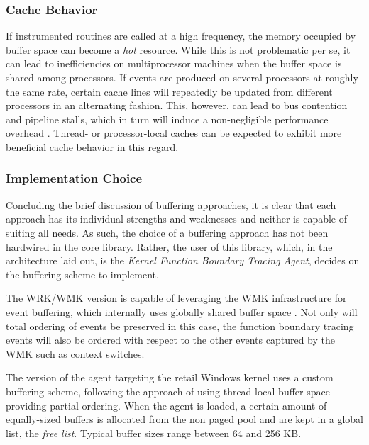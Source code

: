\subsubsection{Cache Behavior}
If instrumented routines are called at a high frequency, the memory occupied by
buffer space can become a \emph{hot} resource. While this is not problematic
per se, it can lead to inefficiencies on multiprocessor machines when the buffer space
is shared among processors. If events are produced on several processors at 
roughly the same rate, certain cache lines will repeatedly be updated from 
different processors in an alternating fashion. This, however, can lead to bus
contention and pipeline stalls, which in turn will induce a non-negligible 
performance overhead \cite{Win2000Perf}. Thread- or processor-local caches
can be expected to exhibit more beneficial cache behavior in this regard.

\subsubsection{Implementation Choice}
\label{sec:BufferImplementation}
Concluding the brief discussion of buffering approaches, it is clear that each
approach has its individual strengths and weaknesses and neither is capable of
suiting all needs. As such, the choice of a buffering approach has not been 
hardwired in the core library. Rather, the user of this library, which, in 
the architecture laid out, is the \emph{Kernel Function Boundary Tracing Agent},
decides on the buffering scheme to implement.

The WRK/WMK version is capable of leveraging the WMK infrastructure for event
buffering, which internally uses globally shared buffer space \cite{Schmidt08}. Not only will
total ordering of events be preserved in this case, the function boundary
tracing events will also be ordered with respect to the other events captured
by the WMK such as context switches.

The version of the agent targeting the retail Windows kernel uses a custom
buffering scheme, following the approach of using thread-local buffer space 
providing partial ordering. When the agent is loaded, a certain amount 
of equally-sized buffers is allocated from the non paged pool and are kept 
in a global list, the \emph{free list}. 
Typical buffer sizes range between 64 and 256 KB.

